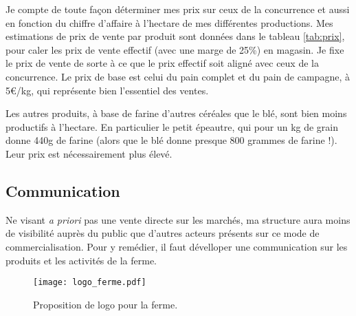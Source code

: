 \documentclass{book}
\begin{document}
Je compte de toute façon déterminer mes prix sur ceux de la concurrence et aussi en fonction du chiffre d’affaire à l’hectare de mes différentes productions. Mes estimations de prix de vente par produit sont données dans le tableau \ref{tab:prix}, pour caler les prix de vente effectif (avec une marge de 25\%) en magasin. Je fixe le prix de vente de sorte à ce que le prix effectif soit aligné avec ceux de la concurrence. Le prix de base est celui du pain complet et du pain de campagne, à 5\euro{}/kg, qui représente bien l’essentiel des ventes.

Les autres produits, à base de farine d’autres céréales que le blé, sont bien moins productifs à l’hectare. En particulier le petit épeautre, qui pour un kg de grain donne 440g de farine (alors que le blé donne presque 800 grammes de farine !). Leur prix est nécessairement plus élevé. 

\subsection{Communication}

Ne visant \textit{a priori} pas une vente directe sur les marchés, ma structure aura moins de visibilité auprès du public que d'autres acteurs présents sur ce mode de commercialisation. Pour y remédier, il faut dévelloper une communication sur les produits et les activités de la ferme.

\begin{figure}[h!]
\begin{center}
	\texttt{[image: logo\_ferme.pdf]}
	\caption{Proposition de logo pour la ferme.}
	\label{fig:logo}
\end{center}
\end{figure}
\end{document}
